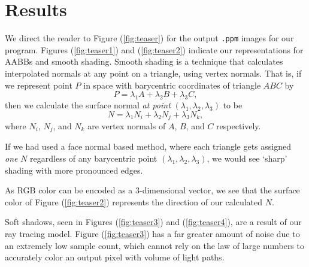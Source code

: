 \documentclass[../main.tex]{subfiles}
\begin{document}
\section{Results}

We direct the reader to Figure (\ref{fig:teaser}) for the output \texttt{.ppm}
images for our program. Figures (\ref{fig:teaser1}) and (\ref{fig:teaser2})
indicate our representations for AABBs and smooth shading. Smooth shading is a
technique that calculates interpolated normals at any point on a triangle,
using vertex normals. That is, if we represent point \(P\) in space with barycentric coordinates of
triangle \(ABC\) by
\begin{equation*}
    P = \lambda_1 A + \lambda_2 B + \lambda_3 C,
\end{equation*}
then we calculate the surface normal \emph{at point} \((\lambda_1, \lambda_2, \lambda_3)\) to be
\begin{equation*}
    N = \lambda_1 N_i + \lambda_2 N_j + \lambda_3 N_k,
\end{equation*}
where \(N_i\), \(N_j\), and \(N_k\) are vertex normals of \(A\), \(B\), and \(C\) respectively.

If we had used a face normal based method, where each triangle gets assigned \emph{one} \(N\)
regardless of any barycentric point \((\lambda_1, \lambda_2, \lambda_3)\), we would see
`sharp' shading with more pronounced edges.

As RGB color can be encoded as a 3-dimensional vector, we see that the surface color of Figure
(\ref{fig:teaser2}) represents the direction of our calculated \(N\).

Soft shadows, seen in Figures (\ref{fig:teaser3}) and (\ref{fig:teaser4}), are
a result of our ray tracing model. Figure (\ref{fig:teaser3}) has a far greater
amount of noise due to an extremely low sample count, which cannot rely on the
law of large numbers to accurately color an output pixel with volume of light
paths.

\ifSubfilesClassLoaded{%
    \nocite{*}
    \twocolumn
}{}
\end{document}

